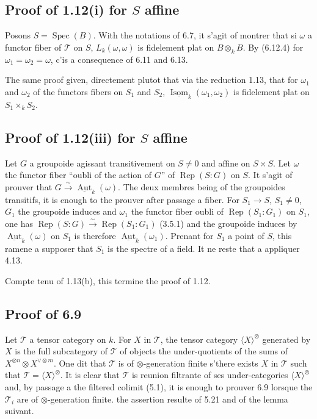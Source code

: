 \documentclass[12pt,a4paper]{article}
\theoremstyle{plain}
\theoremstyle{definition}
\DeclareMathOperator{\Spec}{Spec}
\DeclareMathOperator{\Aut}{Aut}
\DeclareMathOperator{\Isom}{Isom}
\DeclareMathOperator{\Rep}{Rep}
\begin{document}
\subsection{Proof of 1.12(i) for $S$ affine}

Posons $S = \Spec(B)$. With the notations of 6.7, it s'agit of montrer that si $\omega$ a functor fiber of $\mathcal{T}$ on $S$, $L_k(\omega, \omega)$ is fidelement plat on $B \otimes_k B$. By (6.12.4) for $\omega_1 = \omega_2 = \omega$, c'is a consequence of 6.11 and 6.13.

The same proof given, directement plutot that via the reduction 1.13, that for $\omega_1$ and $\omega_2$ of the functors fibers on $S_1$ and $S_2$, $\underline{\Isom}_k(\omega_1, \omega_2)$ is fidelement plat on $S_1 \times_k S_2$.

\subsection{Proof of 1.12(iii) for $S$ affine}

Let $G$ a groupoide agissant transitivement on $S \neq 0$ and affine on $S \times S$. Let $\omega$ the functor fiber ``oubli of the action of $G$'' of $\Rep(S : G)$ on $S$. It s'agit of prouver that $G \xrightarrow{\sim} \underline{\Aut}_k(\omega)$. The deux membres being of the groupoides transitifs, it is enough to the prouver after passage a fiber. For $S_1 \to S$, $S_1 \neq 0$, $G_1$ the groupoide induces and $\omega_1$ the functor fiber oubli of $\Rep(S_1 : G_1)$ on $S_1$, one has $\Rep(S : G) \xrightarrow{\sim} \Rep(S_1 : G_1)$ (3.5.1) and the groupoide induces by $\underline{\Aut}_k(\omega)$ on $S_1$ is therefore $\underline{\Aut}_k(\omega_1)$. Prenant for $S_1$ a point of $S$, this ramene a supposer that $S_1$ is the spectre of a field. It ne reste that a appliquer 4.13.

Compte tenu of 1.13(b), this termine the proof of 1.12.

\subsection{Proof of 6.9}

Let $\mathcal{T}$ a tensor category on $k$. For $X$ in $\mathcal{T}$, the tensor category $\langle X \rangle^\otimes$ generated by $X$ is the full subcategory of $\mathcal{T}$ of objects the under-quotients of the sums of $X^{\otimes n} \otimes X^{\vee \otimes m}$. One dit that $\mathcal{T}$ is of $\otimes$-generation finite s'there exists $X$ in $\mathcal{T}$ such that $\mathcal{T} = \langle X \rangle^\otimes$. It is clear that $\mathcal{T}$ is reunion filtrante of ses under-categories $\langle X \rangle^\otimes$ and, by passage a the filtered colimit (5.1), it is enough to prouver 6.9 lorsque the $\mathcal{T}_i$ are of $\otimes$-generation finite. the assertion resulte of 5.21 and of the lemma suivant.
\end{document}
